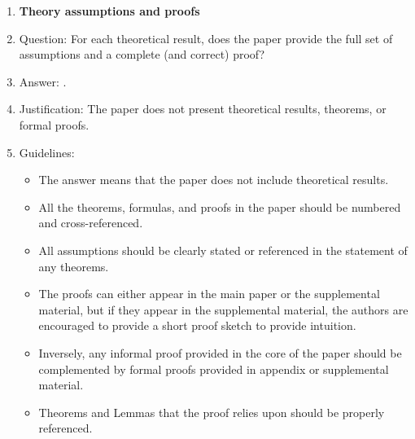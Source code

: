 \begin{enumerate}
\begin{itemize}
        \item If applicable, the authors should discuss possible limitations of their approach to address problems of privacy and fairness.
        \item While the authors might fear that complete honesty about limitations might be used by reviewers as grounds for rejection, a worse outcome might be that reviewers discover limitations that aren't acknowledged in the paper. The authors should use their best judgment and recognize that individual actions in favor of transparency play an important role in developing norms that preserve the integrity of the community. Reviewers will be specifically instructed to not penalize honesty concerning limitations.
    \end{itemize}

\item {\bf Theory assumptions and proofs}
    \item[] Question: For each theoretical result, does the paper provide the full set of assumptions and a complete (and correct) proof?
    \item[] Answer: \answerNA{}.
    \item[] Justification: The paper does not present theoretical results, theorems, or formal proofs.
    \item[] Guidelines:
    \begin{itemize}
        \item The answer \answerNA{} means that the paper does not include theoretical results. 
        \item All the theorems, formulas, and proofs in the paper should be numbered and cross-referenced.
        \item All assumptions should be clearly stated or referenced in the statement of any theorems.
        \item The proofs can either appear in the main paper or the supplemental material, but if they appear in the supplemental material, the authors are encouraged to provide a short proof sketch to provide intuition. 
        \item Inversely, any informal proof provided in the core of the paper should be complemented by formal proofs provided in appendix or supplemental material.
        \item Theorems and Lemmas that the proof relies upon should be properly referenced. 
    \end{itemize}


\end{enumerate}
